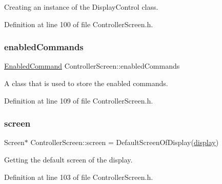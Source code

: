 Creating an instance of the Display\+Control class. 



Definition at line 100 of file Controller\+Screen.\+h.

\mbox{\label{class_controller_screen_a96533700d5a3a0593d9b9d24a724b16b}} 
\subsubsection{\texorpdfstring{enabled\+Commands}{enabledCommands}}
{\footnotesize\ttfamily \hyperlink{class_gesture_detection_1_1_enabled_command}{Enabled\+Command} Controller\+Screen\+::enabled\+Commands\hspace{0.3cm}{\ttfamily [private]}}



A class that is used to store the enabled commands. 



Definition at line 109 of file Controller\+Screen.\+h.

\mbox{\label{class_controller_screen_ae667566a3438ae194170858cd328053e}} 
\subsubsection{\texorpdfstring{screen}{screen}}
{\footnotesize\ttfamily Screen$\ast$ Controller\+Screen\+::screen = Default\+Screen\+Of\+Display(\hyperlink{class_controller_screen_a240495b9e446bc512d8a7498b3f45981}{display})\hspace{0.3cm}{\ttfamily [private]}}



Getting the default screen of the display. 



Definition at line 103 of file Controller\+Screen.\+h.

\mbox{\label{class_controller_screen_afe5953fdc933fcc35cf0ef841c83f18c}} 
